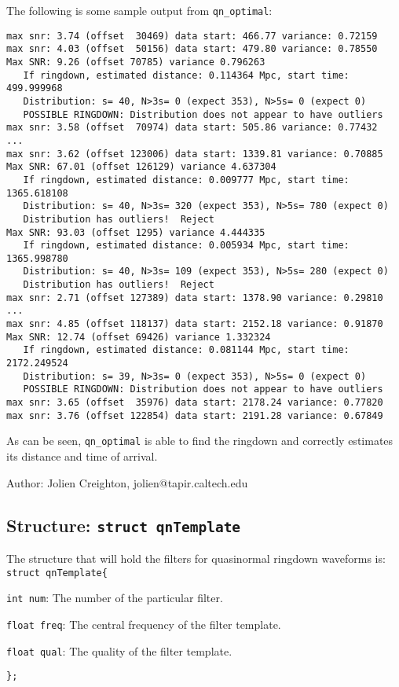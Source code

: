 The following is some sample output from \texttt{qn\_optimal}:

\begin{verbatim}
max snr: 3.74 (offset  30469) data start: 466.77 variance: 0.72159
max snr: 4.03 (offset  50156) data start: 479.80 variance: 0.78550
Max SNR: 9.26 (offset 70785) variance 0.796263
   If ringdown, estimated distance: 0.114364 Mpc, start time: 499.999968
   Distribution: s= 40, N>3s= 0 (expect 353), N>5s= 0 (expect 0)
   POSSIBLE RINGDOWN: Distribution does not appear to have outliers
max snr: 3.58 (offset  70974) data start: 505.86 variance: 0.77432
...
max snr: 3.62 (offset 123006) data start: 1339.81 variance: 0.70885
Max SNR: 67.01 (offset 126129) variance 4.637304
   If ringdown, estimated distance: 0.009777 Mpc, start time: 1365.618108
   Distribution: s= 40, N>3s= 320 (expect 353), N>5s= 780 (expect 0)
   Distribution has outliers!  Reject
Max SNR: 93.03 (offset 1295) variance 4.444335
   If ringdown, estimated distance: 0.005934 Mpc, start time: 1365.998780
   Distribution: s= 40, N>3s= 109 (expect 353), N>5s= 280 (expect 0)
   Distribution has outliers!  Reject
max snr: 2.71 (offset 127389) data start: 1378.90 variance: 0.29810
...
max snr: 4.85 (offset 118137) data start: 2152.18 variance: 0.91870
Max SNR: 12.74 (offset 69426) variance 1.332324
   If ringdown, estimated distance: 0.081144 Mpc, start time: 2172.249524
   Distribution: s= 39, N>3s= 0 (expect 353), N>5s= 0 (expect 0)
   POSSIBLE RINGDOWN: Distribution does not appear to have outliers
max snr: 3.65 (offset  35976) data start: 2178.24 variance: 0.77820
max snr: 3.76 (offset 122854) data start: 2191.28 variance: 0.67849
\end{verbatim}

As can be seen, \texttt{qn\_optimal} is able to find the ringdown and
correctly estimates its distance and time of arrival.

\begin{description}
\item{Author:} Jolien Creighton, jolien@tapir.caltech.edu
\end{description}

\clearpage
{}


\clearpage
\subsection{Structure: \texttt{struct qnTemplate}}

The structure that will hold the filters for quasinormal ringdown waveforms
is: \texttt{struct qnTemplate\{}
\begin{description}
\item{\texttt{int num}}:  The number of the particular filter.
\item{\texttt{float freq}}:  The central frequency of the filter template.
\item{\texttt{float qual}}:  The quality of the filter template.
\end{description}
\texttt{\};}

